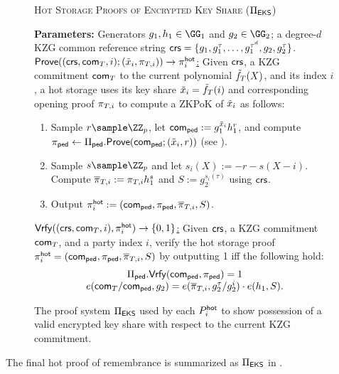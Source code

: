 \begin{figure*}[tb]
    \centering
    \begin{mdframed}
    \begin{center}
        \textsc{Hot Storage Proofs of Encrypted Key Share ($\Pi_{\sf EKS}$)}
    \end{center}
    \medskip
    \textbf{Parameters:} Generators $g_1,h_1 \in \GG_1$ and $g_2 \in \GG_2$; a degree-$d$ KZG common reference string $\mathsf{crs} = \{g_1, g_1^\tau, \dots, g_1^{\tau^d}, g_2, g_2^\tau\}$.
    \hfill\medskip\\
    \underline{$\mathsf{Prove}((\mathsf{crs}, \mathsf{com}_{T}, i); (\tilde{x}_i, \pi_{T,i})) \to \pi_i^{\mathsf{hot}}$:} Given $\mathsf{crs}$, a KZG commitment $\mathsf{com}_{T}$ to the current polynomial $\tilde{f}_{T}(X)$, and its index $i$, a hot storage uses its key share $\tilde{x}_i = \tilde{f}_{T}(i)$ and corresponding opening proof $\pi_{T,i}$
    to compute a ZKPoK of $\tilde{x}_i$ as follows:
    \begin{enumerate}
        \item Sample $r \sample \ZZ_p$, let $\mathsf{com}_{\sf ped} := g_1^{\tilde{x}_i} h_1^r$, and compute $\pi_{\sf ped} \gets \Pi_{\sf ped}.{\sf Prove}(\mathsf{com}_{\sf ped}; (\tilde{x}_i,r))$ (see ).
        \item Sample $s \sample \ZZ_p$ and let $s_i(X) := -r - s(X -i)$. Compute $\overline{\pi}_{T,i} := \pi_{T,i} h_1^s$ and $S := g_2^{s_i(\tau)}$ using $\mathsf{crs}$.
        \item Output $\pi_i^{\mathsf{hot}} := (\mathsf{com}_{\sf ped}, \pi_{\sf ped}, \overline{\pi}_{T,i}, S)$.
    \end{enumerate}
    \underline{$\mathsf{Vrfy}((\mathsf{crs}, \mathsf{com}_{T}, i), \pi_i^{\mathsf{hot}}) \to \{0,1\}$:} Given $\mathsf{crs}$, a KZG commitment $\mathsf{com}_{T}$, and a party index $i$, verify the hot storage proof $\pi_i^{\mathsf{hot}} = (\mathsf{com}_{\sf ped}, \pi_{\sf ped}, \overline{\pi}_{T,i}, S)$ by outputting 1 iff the following hold: 
    \[\begin{array}{c}
        \Pi_{\sf ped}.\mathsf{Vrfy}(\mathsf{com}_{\sf ped}, \pi_{\sf ped}) = 1\\
        e(\mathsf{com}_{T} / \mathsf{com}_{\sf ped}, g_2) = e(\overline{\pi}_{T,i}, g_2^\tau / g_2^i) \cdot e(h_1, S).
    \end{array}\]
    \end{mdframed}
    \caption{The proof system $\Pi_{\sf EKS}$ used by each $P_i^{\mathsf{hot}}$ to show possession of a valid encrypted key share with respect to the current KZG commitment.}
    \label{fig:pi_eks}
\end{figure*}

The final hot proof of remembrance is summarized as $\Pi_{\sf EKS}$ in . 